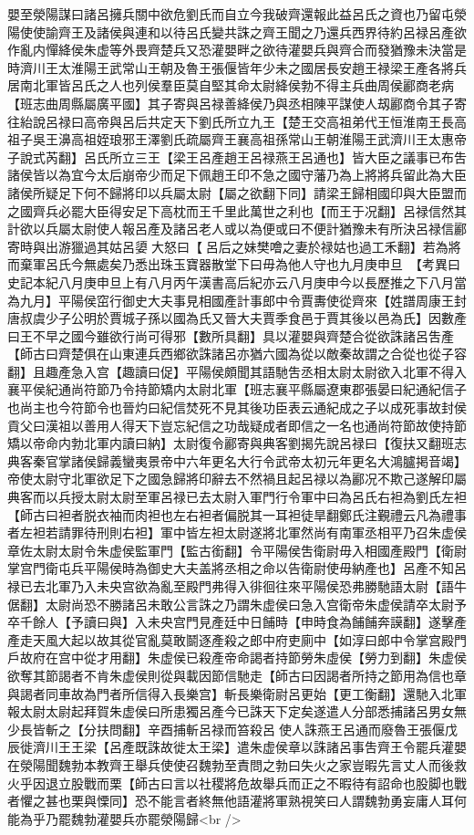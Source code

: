 嬰至滎陽謀曰諸呂擁兵關中欲危劉氏而自立今我破齊還報此益呂氏之資也乃留屯滎陽使使諭齊王及諸侯與連和以待呂氏變共誅之齊王聞之乃還兵西界待約呂禄呂產欲作亂内憚絳侯朱虚等外畏齊楚兵又恐灌嬰畔之欲待灌嬰兵與齊合而發猶豫未決當是時濟川王太淮陽王武常山王朝及魯王張偃皆年少未之國居長安趙王禄梁王產各將兵居南北軍皆呂氏之人也列侯羣臣莫自堅其命太尉絳侯勃不得主兵曲周侯酈商老病【班志曲周縣屬廣平國】其子寄與呂禄善絳侯乃與丞相陳平謀使人刼酈商令其子寄往紿說呂禄曰高帝與呂后共定天下劉氏所立九王【楚王交高祖弟代王恒淮南王長高祖子吳王濞高祖姪琅邪王澤劉氏疏屬齊王襄高祖孫常山王朝淮陽王武濟川王太惠帝子說式芮翻】呂氏所立三王【梁王呂產趙王呂禄燕王呂通也】皆大臣之議事已布吿諸侯皆以為宜今太后崩帝少而足下佩趙王印不急之國守藩乃為上將將兵留此為大臣諸侯所疑足下何不歸將印以兵屬太尉【屬之欲翻下同】請梁王歸相國印與大臣盟而之國齊兵必罷大臣得安足下高枕而王千里此萬世之利也【而王于况翻】呂禄信然其計欲以兵屬太尉使人報呂產及諸呂老人或以為便或曰不便計猶豫未有所決呂禄信酈寄時與出游獵過其姑呂嬃大怒曰【呂后之妹樊噲之妻於禄姑也過工禾翻】若為將而棄軍呂氏今無處矣乃悉出珠玉寶器散堂下曰毋為他人守也九月庚申旦　【考異曰史記本紀八月庚申旦上有八月丙午漢書高后紀亦云八月庚申今以長歷推之下八月當為九月】平陽侯窋行御史大夫事見相國產計事郎中令賈夀使從齊來【姓譜周康王封唐叔虞少子公明於賈城子孫以國為氏又晉大夫賈季食邑于賈其後以邑為氏】因數產曰王不早之國今雖欲行尚可得邪【數所具翻】具以灌嬰與齊楚合從欲誅諸呂吿產【師古曰齊楚俱在山東連兵西鄉欲誅諸呂亦猶六國為從以敵秦故謂之合從也從子容翻】且趣產急入宫【趣讀曰促】平陽侯頗聞其語馳吿丞相太尉太尉欲入北軍不得入襄平侯紀通尚符節乃令持節矯内太尉北軍【班志襄平縣屬遼東郡張晏曰紀通紀信子也尚主也今符節令也晉灼曰紀信焚死不見其後功臣表云通紀成之子以成死事故封侯貢父曰漢祖以善用人得天下豈忘紀信之功哉疑成者即信之一名也通尚符節故使持節矯以帝命内勃北軍内讀曰納】太尉復令酈寄與典客劉揭先說呂禄曰【復扶又翻班志典客秦官掌諸侯歸義蠻夷景帝中六年更名大行令武帝太初元年更名大鴻臚掲音竭】帝使太尉守北軍欲足下之國急歸將印辭去不然禍且起呂禄以為酈况不欺己遂解印屬典客而以兵授太尉太尉至軍呂禄已去太尉入軍門行令軍中曰為呂氏右袒為劉氏左袒【師古曰袒者脱衣袖而肉袒也左右袒者偏脱其一耳袒徒旱翻鄭氏注覲禮云凡為禮事者左袒若請罪待刑則右袒】軍中皆左袒太尉遂將北軍然尚有南軍丞相平乃召朱虚侯章佐太尉太尉令朱虚侯監軍門【監古銜翻】令平陽侯吿衛尉毋入相國產殿門【衛尉掌宫門衛屯兵平陽侯時為御史大夫盖將丞相之命以告衛尉使毋納產也】呂產不知呂禄已去北軍乃入未央宫欲為亂至殿門弗得入徘徊往來平陽侯恐弗勝馳語太尉【語牛倨翻】太尉尚恐不勝諸呂未敢公言誅之乃謂朱虚侯曰急入宫衛帝朱虚侯請卒太尉予卒千餘人【予讀曰與】入未央宫門見產廷中日餔時【申時食為餔餔奔謨翻】遂擊產產走天風大起以故其從官亂莫敢鬬逐產殺之郎中府吏廁中【如淳曰郎中令掌宫殿門戶故府在宫中從才用翻】朱虚侯已殺產帝命謁者持節勞朱虛侯【勞力到翻】朱虚侯欲奪其節謁者不肯朱虚侯則從與載因節信馳走【師古曰因謁者所持之節用為信也章與謁者同車故為門者所信得入長樂宫】斬長樂衛尉呂更始【更工衡翻】還馳入北軍報太尉太尉起拜賀朱虚侯曰所患獨呂產今已誅天下定矣遂遣人分部悉捕諸呂男女無少長皆斬之【分扶問翻】辛酉捕斬呂禄而笞殺呂使人誅燕王呂通而廢魯王張偃戊辰徙濟川王王梁【呂產既誅故徙太王梁】遣朱虚侯章以誅諸呂事吿齊王令罷兵灌嬰在滎陽聞魏勃本教齊王舉兵使使召魏勃至責問之勃曰失火之家豈暇先言丈人而後救火乎因退立股戰而栗【師古曰言以社稷將危故舉兵而正之不暇待有詔命也股脚也戰者懼之甚也栗與慄同】恐不能言者終無他語灌將軍熟視笑曰人謂魏勃勇妄庸人耳何能為乎乃罷魏勃灌嬰兵亦罷滎陽歸<br />
